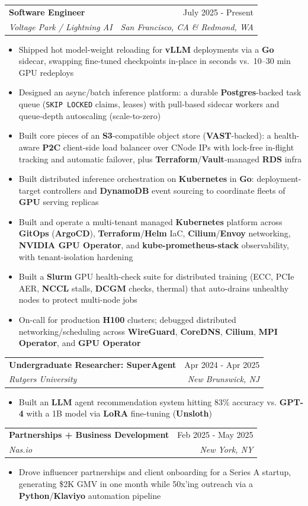 \documentclass[letterpaper,11pt]{article}
\makeatletter
\newcommand{\resumeItem}[1]{\item\small{{#1 \vspace{-3.5pt}}}}
\newcommand{\resumeSubheading}[4]{\vspace{-2pt}\item
  \begin{tabular*}{\textwidth}[t]{l@{\extracolsep{\fill}}r}
    \textbf{#1} & #2 \\
    \textit{\small #3} & \textit{\small #4} \\
  \end{tabular*}\vspace{-7pt}}
\newcommand{\resumeItemListStart}{\begin{itemize}[leftmargin=0.10in]}
\newcommand{\resumeItemListEnd}{\end{itemize}\vspace{-4pt}}
\makeatother
\begin{document}
  \resumeSubheading
    {Software Engineer}{July 2025 - Present}{Voltage Park / Lightning AI}{San Francisco, CA \& Redmond, WA}
    \resumeItemListStart
      \resumeItem{Shipped hot model-weight reloading for \textbf{vLLM} deployments via a \textbf{Go} sidecar, swapping fine-tuned checkpoints in-place in seconds vs.\ 10--30 min GPU redeploys}
      \resumeItem{Designed an async/batch inference platform: a durable \textbf{Postgres}-backed task queue (\texttt{SKIP LOCKED} claims, leases) with pull-based sidecar workers and queue-depth autoscaling (scale-to-zero)}
      \resumeItem{Built core pieces of an \textbf{S3}-compatible object store (\textbf{VAST}-backed): a health-aware \textbf{P2C} client-side load balancer over CNode IPs with lock-free in-flight tracking and automatic failover, plus \textbf{Terraform}/\textbf{Vault}-managed \textbf{RDS} infra}
      \resumeItem{Built distributed inference orchestration on \textbf{Kubernetes} in \textbf{Go}: deployment-target controllers and \textbf{DynamoDB} event sourcing to coordinate fleets of \textbf{GPU} serving replicas}
      \resumeItem{Built and operate a multi-tenant managed \textbf{Kubernetes} platform across \textbf{GitOps} (\textbf{ArgoCD}), \textbf{Terraform}/\textbf{Helm} IaC, \textbf{Cilium}/\textbf{Envoy} networking, \textbf{NVIDIA GPU Operator}, and \textbf{kube-prometheus-stack} observability, with tenant-isolation hardening}
      \resumeItem{Built a \textbf{Slurm} GPU health-check suite for distributed training (ECC, PCIe AER, \textbf{NCCL} stalls, \textbf{DCGM} checks, thermal) that auto-drains unhealthy nodes to protect multi-node jobs}
      \resumeItem{On-call for production \textbf{H100} clusters; debugged distributed networking/scheduling across \textbf{WireGuard}, \textbf{CoreDNS}, \textbf{Cilium}, \textbf{MPI Operator}, and \textbf{GPU Operator}}
    \resumeItemListEnd

  \resumeSubheading
    {Undergraduate Researcher: SuperAgent}{Apr 2024 - Apr 2025}{Rutgers University}{New Brunswick, NJ}
    \resumeItemListStart
      \resumeItem{Built an \textbf{LLM} agent recommendation system hitting 83\% accuracy vs. \textbf{GPT-4} with a 1B model via \textbf{LoRA} fine-tuning (\textbf{Unsloth})}
    \resumeItemListEnd

  \resumeSubheading
    {Partnerships + Business Development}{Feb 2025 - May 2025}{Nas.io}{New York, NY}
    \resumeItemListStart
      \resumeItem{Drove influencer partnerships and client onboarding for a Series A startup, generating \$2K GMV in one month while 50x'ing outreach via a \textbf{Python}/\textbf{Klaviyo} automation pipeline}
    \resumeItemListEnd
\end{document}
